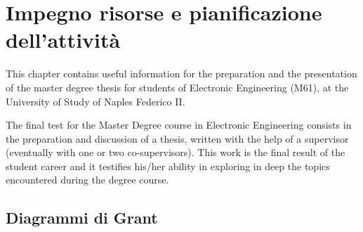 %
%	 
%

\chapter{Impegno risorse e pianificazione dell'attività}

This chapter contains useful information for the preparation and the presentation of the master degree thesis for students of Electronic Engineering (M61), at the University of Study of Naples Federico II.

The final test for the Master Degree course in Electronic Engineering consists in the preparation and discussion of a thesis, written with the help of a supervisor (eventually with one or two co-supervisors). This work is the final result of the student career and it testifies his/her ability in exploring in deep the topics encountered during the degree course.

\section{Diagrammi di Grant}
